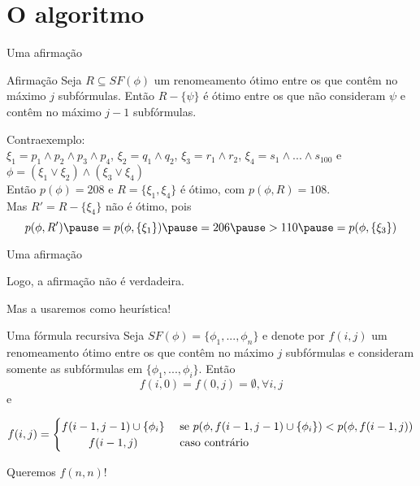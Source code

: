
\section{O algoritmo}

\begin{frame}{Uma afirmação}
	\begin{block}{Afirmação}
		Seja $R \subseteq SF(\phi)$ um renomeamento ótimo entre os que contêm no máximo $j$ subfórmulas. Então $R - \{\psi \}$ é ótimo entre os que não consideram $\psi$ e contêm no máximo $j-1$ subfórmulas.
	\end{block}
	
	\pause Contraexemplo:\\
	\pause$\xi_1 = p_1 \wedge p_2 \wedge p_3 \wedge p_4$, \pause$\xi_2 = q_1 \wedge q_2$, \pause$\xi_3 = r_1 \wedge r_2$, \pause$\xi_4 = s_1 \wedge ... \wedge s_{100}$ \pause e $\phi = (\xi_1 \vee \xi_2) \wedge (\xi_3 \vee \xi_4)$\\
	\pause Então $p(\phi) = 208$ \pause e $R = \{\xi_1,\xi_4 \}$ é ótimo, com $p(\phi,R) = 108$.\\
	\pause Mas $R' = R - \{\xi_4 \}$ não é ótimo, pois \pause $$p(\phi,R') \pause = p(\phi,\{\xi_1 \}) \pause = 206 \pause > 110 \pause = p(\phi,\{\xi_3 \})$$
\end{frame}

\begin{frame}{Uma afirmação}
	\begin{center}
		Logo, a afirmação não é verdadeira.
		
		\pause Mas a usaremos como heurística!
	\end{center}
\end{frame}

\begin{frame}{Uma fórmula recursiva}
	Seja $SF(\phi) = \{\phi_1,...,\phi_n \}$ e denote por $f(i,j)$ um renomeamento ótimo entre os que contêm no máximo $j$ subfórmulas e consideram somente as subfórmulas em $\{\phi_1,...,\phi_i \}$. \pause Então $$f(i,0) = f(0,j) = \emptyset, \forall i,j$$ \pause e
	\begin{footnotesize}
	\[
	f(i,j) =
	\begin{cases} 
	\hfill f(i-1,j-1) \cup \{\phi_i \}   \hfill & \text{ se } p(\phi,f(i-1,j-1) \cup \{\phi_i \}) < p(\phi,f(i-1,j)) \\
	\hfill f(i-1,j) \hfill & \text{ caso contrário} \\
	\end{cases}
	\]
	\end{footnotesize}
	
	\pause Queremos $f(n,n)$!
\end{frame}

